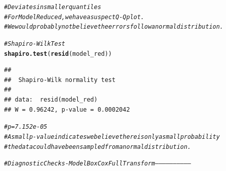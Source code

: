 \documentclass{article}\usepackage[]{graphicx}\usepackage[]{color}
\makeatletter
\newcommand{\hlcom}[1]{\textcolor[rgb]{0.678,0.584,0.686}{\textit{#1}}}%
\newcommand{\hlstd}[1]{\textcolor[rgb]{0.345,0.345,0.345}{#1}}%
\newcommand{\hlkwd}[1]{\textcolor[rgb]{0.737,0.353,0.396}{\textbf{#1}}}%
\newenvironment{kframe}{%
 \def\at@end@of@kframe{}%
 \ifinner\ifhmode%
  \def\at@end@of@kframe{\end{minipage}}%
  \begin{minipage}{\columnwidth}%
 \fi\fi%
 \def\FrameCommand##1{\hskip\@totalleftmargin \hskip-\fboxsep
 \colorbox{shadecolor}{##1}\hskip-\fboxsep
     \hskip-\linewidth \hskip-\@totalleftmargin \hskip\columnwidth}%
 \MakeFramed {\advance\hsize-\width
   \@totalleftmargin\z@ \linewidth\hsize
   \@setminipage}}%
 {\par\unskip\endMakeFramed%
 \at@end@of@kframe}
\newenvironment{knitrout}{}{} %
\makeatother
\begin{document}
\begin{knitrout}
{}


\begin{kframe}\begin{alltt}
\hlcom{# Deviates in smaller quantiles}
\hlcom{# For Model Reduced, we have a suspect Q-Q plot. }
\hlcom{# We would probably not believe the errors follow a normal distribution.}


\hlcom{# Shapiro-Wilk Test}
\hlkwd{shapiro.test}\hlstd{(}\hlkwd{resid}\hlstd{(model_red))}
\end{alltt}
\begin{verbatim}
## 
## 	Shapiro-Wilk normality test
## 
## data:  resid(model_red)
## W = 0.96242, p-value = 0.0002042
\end{verbatim}
\begin{alltt}
\hlcom{# p = 7.152e-05}
\hlcom{# A small p-value indicates we believe there is only a small probability }
\hlcom{# the data could have been sampled from a normal distribution.}


\hlcom{# Diagnostic Checks - Model Box Cox Full Transform -----------------------------}


\end{alltt}
\end{kframe}
\end{knitrout}
\end{document}
